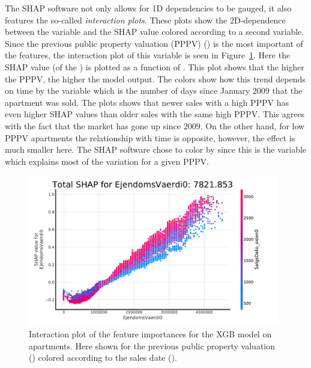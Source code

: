 The SHAP software \citep{lundbergConsistentIndividualizedFeature2018} not only allows for 1D dependencies to be gauged, it also features the so-called \emph{interaction plots}. These plots show the 2D-dependence between the variable and the SHAP value colored according to a second variable. Since the previous public property valuation (PPPV) () is the most important of the features, the interaction plot of this variable is seen in Figure~\ref{fig:h:shap_overview_interaction}. Here the SHAP value (of the ) is plotted as a function of . This plot shows that the higher the PPPV, the higher the model output. The colors show how this trend depends on time by the variable  which is the number of days since January  2009 that the apartment was sold. The plots shows that newer sales with a high PPPV has even higher SHAP values than older sales with the same high PPPV. This agrees with the fact that the market has gone up since 2009. On the other hand, for low PPPV apartments the relationship with time is opposite, however, the effect is much smaller here. The SHAP software chose to color by  since this is the variable which explains most of the variation for a given PPPV. 

\begin{figure}
  \centerfloat
  \includegraphics[draft=false, width=0.98\textwidth, trim=15 15 40 40, clip]{figures/housing/Ejerlejlighed_v19_cut_all_Ncols_all_xgb_tight_SHAP_vals_interaction_Vaerdi0.pdf}
  \caption[Feature Importance Interaction Plot for Apartments]
          {Interaction plot of the feature importances for the XGB model on apartments. Here shown for the previous public property valuation () colored according to the sales date ().} 
  \label{fig:h:shap_overview_interaction}
\end{figure}

